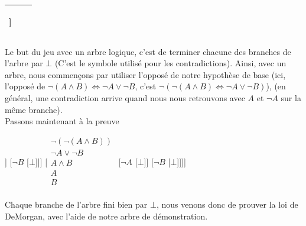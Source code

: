 \documentclass[a4paper, 12pt]{article}
\newcommand{\ffi}{\Leftrightarrow}
\numberwithin{equation}{subsection}
\begin{document}
\begin{center}
\begin{table}[H]
\begin{tabular}{|M{2.5cm}|M{2.5cm}|M{2.5cm}|}
       \begin{forest} [$\neg (\phi \ffi \psi)$ [$\begin{array}{c}\phi \\ \neg \psi\end{array}$] [$\begin{array}{c}\neg \phi \\ \psi\end{array}$]]  \end{forest} \\
      \hline
    \end{tabular}
  \end{table}
  \end{center}
  Le but du jeu avec un arbre logique, c'est de terminer chacune des branches de l'arbre par $\bot$ (C'est le symbole utilisé pour les contradictions). Ainsi, avec un arbre, nous commençons par utiliser l'opposé de notre hypothèse de base (ici, l'opposé de $\neg (A \land B) \ffi \neg A \lor \neg B$, c'est $\neg (\neg (A \land B) \ffi \neg A \lor \neg B)$), (en général, une contradiction arrive quand nous nous retrouvons avec $A$ et $\neg A$ sur la même branche). \\

  Passons maintenant à la preuve
  \begin{center}
  \begin{forest}
  [$\neg (\neg (A \land B) \ffi \neg A \lor \neg B)$
  [$\begin{array}{c}
    \neg(A \land B)\\
    \neg (\neg A \lor \neg B)\\
    A \\
    B \\
   \end{array}$
    [$\neg A$
    [$\bot$]]
    [$\neg B$
    [$\bot$]]]
    [$\begin{array}{c}
        \neg (\neg (A \land B)) \\
        \neg A \lor \neg B \\
        A \land B \\
        A \\
        B \\
      \end{array}$
    [$\neg A$
    [$\bot$]]
    [$\neg B$
    [$\bot$]]]]
  \end{forest}
\end{center}
Chaque branche de l'arbre fini bien par $\bot$, nous venons donc de prouver la loi de DeMorgan, avec l'aide de notre arbre de démonstration. \\
\end{document}

